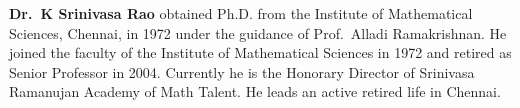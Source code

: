 \bigskip

\noindent
\textbf{Dr.\ K Srinivasa Rao} obtained Ph.D. from the Institute of Mathematical Sciences, Chennai, in 1972 under the guidance of Prof.\ Alladi Ramakrishnan. He joined the faculty of the Institute of Mathematical Sciences in 1972 and retired as Senior Professor in 2004. Currently he is the Honorary Director of Srinivasa Ramanujan Academy of Math Talent. He leads an active retired life in Chennai.

